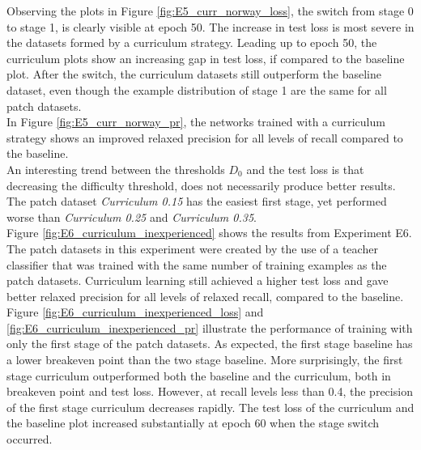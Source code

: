 Observing the plots in Figure \ref{fig:E5_curr_norway_loss}, the switch from stage 0 to stage 1, is clearly visible at epoch 50. The increase in test loss is most severe in the datasets formed by a curriculum strategy. Leading up to epoch 50, the curriculum plots show an increasing gap in test loss, if compared to the baseline plot. After the switch, the curriculum datasets still outperform the baseline dataset, even though the example distribution of stage 1 are the same for all patch datasets.\\

In Figure \ref{fig:E5_curr_norway_pr}, the networks trained with a curriculum strategy shows  an improved relaxed precision for all levels of recall compared to the baseline.\\

An interesting trend between the thresholds $D_0$ and the test loss is that decreasing the difficulty threshold, does not necessarily produce better results. The patch dataset \textit{Curriculum 0.15} has the easiest first stage, yet performed worse than \textit{Curriculum 0.25} and \textit{Curriculum 0.35}.\\

Figure \ref{fig:E6_curriculum_inexperienced} shows the results from Experiment E6. The patch datasets in this experiment were created by the use of a teacher classifier that was trained with the same number of training examples as the patch datasets. Curriculum learning still achieved a higher test loss and gave better relaxed precision for all levels of relaxed recall, compared to the baseline.\\

Figure \ref{fig:E6_curriculum_inexperienced_loss} and \ref{fig:E6_curriculum_inexperienced_pr} illustrate  the performance of training with only the first stage of the patch datasets. As expected, the first stage baseline has a lower breakeven point than the two stage baseline. More surprisingly, the first stage curriculum outperformed both the baseline and the curriculum, both in breakeven point and test loss. However, at recall levels less than 0.4, the precision of the first stage curriculum decreases rapidly. The test loss of the curriculum and the baseline plot  increased substantially at epoch 60 when the stage switch occurred. \\


